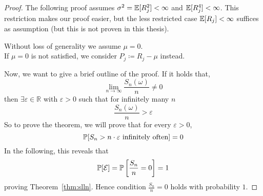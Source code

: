 \begin{proof}
  The following proof assumes $\sigma^2 = \mathbb E[R_j^2] < \infty$ and $\mathbb E[R_j^4] < \infty$.
  This restriction makes our proof easier, but the less restricted case $\mathbb E[R_j] < \infty$ suffices as assumption
  (but this is not proven in this thesis).

  Without loss of generality we assume $\mu = 0$. \\
  If $\mu = 0$ is not satisfied, we consider $P_j \coloneqq R_j - \mu$ instead.

  Now, we want to give a brief outline of the proof. If it holds that,
  \[ \lim_{n\to\infty} \frac{S_n(\omega)}{n} \neq 0 \]
  then $\exists \varepsilon \in \mathbb R$ with $\varepsilon > 0$ such that for infinitely many $n$
  \[ \frac{S_n(\omega)}{n} > \varepsilon \]
  So to prove the theorem, we will prove that for every $\varepsilon > 0$,
  \[ \mathbb P[S_n > n \cdot \varepsilon \text{ infinitely often}] = 0 \]
  In the following, this reveals that
  \[ \mathbb P[\mathcal E] = \mathbb P\left[\frac{S_n}{n} = 0\right] = 1 \]
  proving Theorem~\ref{thm:slln}. Hence condition $\frac{S_n}{n} = 0$ holds with probability $1$.


\end{proof}
